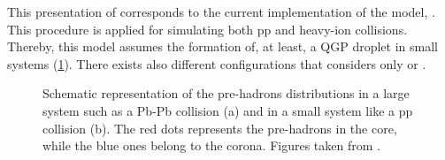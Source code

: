 This presentation of \Epos corresponds to the current implementation of the model, \EposFour. This procedure is applied for simulating both pp and heavy-ion collisions. Thereby, this model assumes the formation of, at least, a QGP droplet in small systems (\fig\ref{fig:CoreCoronaPbPbpp}). There exists also different configurations that considers only  or .

\begin{figure}[t]
\centering
{}
\caption{Schematic representation of the pre-hadrons distributions in a large system such as a Pb-Pb collision (a) and in a small system like a pp collision (b). The red dots represents the pre-hadrons in the core, while the blue ones belong to the corona. Figures taken from \cite{wernerCorecoronaProcedureMicrocanonical2023}.}
	\label{fig:CoreCoronaPbPbpp}
\end{figure}

